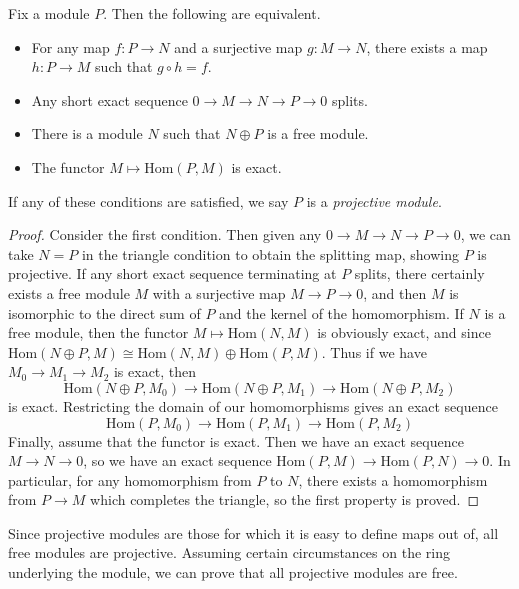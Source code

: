 \begin{theorem}
    Fix a module $P$. Then the following are equivalent.
    \begin{itemize}
        \item For any map $f: P \to N$ and a surjective map $g: M \to N$, there exists a map $h: P \to M$ such that $g \circ h = f$.

        \item Any short exact sequence $0 \to M \to N \to P \to 0$ splits.

        \item There is a module $N$ such that $N \oplus P$ is a free module.

        \item The functor $M \mapsto \text{Hom}(P,M)$ is exact.
    \end{itemize}
    If any of these conditions are satisfied, we say $P$ is a \emph{projective module}.
\end{theorem}
\begin{proof}
    Consider the first condition. Then given any $0 \to M \to N \to P \to 0$, we can take $N = P$ in the triangle condition to obtain the splitting map, showing $P$ is projective. If any short exact sequence terminating at $P$ splits, there certainly exists a free module $M$ with a surjective map $M \to P \to 0$, and then $M$ is isomorphic to the direct sum of $P$ and the kernel of the homomorphism. If $N$ is a free module, then the functor $M \mapsto \text{Hom}(N,M)$ is obviously exact, and since $\text{Hom}(N \oplus P, M) \cong \text{Hom}(N,M) \oplus \text{Hom}(P,M)$. Thus if we have $M_0 \to M_1 \to M_2$ is exact, then
    \[ \text{Hom}(N \oplus P, M_0) \to \text{Hom}(N \oplus P, M_1) \to \text{Hom}(N \oplus P, M_2) \]
    is exact. Restricting the domain of our homomorphisms gives an exact sequence
    \[ \text{Hom}(P,M_0) \to \text{Hom}(P,M_1) \to \text{Hom}(P,M_2) \]
    Finally, assume that the functor is exact. Then we have an exact sequence $M \to N \to 0$, so we have an exact sequence $\text{Hom}(P,M) \to \text{Hom}(P,N) \to 0$. In particular, for any homomorphism from $P$ to $N$, there exists a homomorphism from $P \to M$ which completes the triangle, so the first property is proved.
\end{proof}

Since projective modules are those for which it is easy to define maps out of, all free modules are projective. Assuming certain circumstances on the ring underlying the module, we can prove that all projective modules are free.

